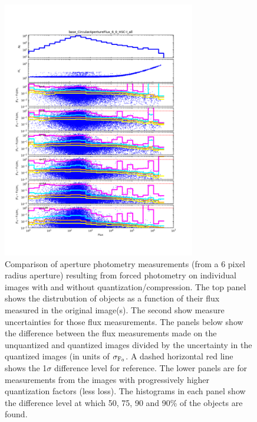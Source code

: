 \begin{figure}
\centering
\includegraphics[width=0.75\textwidth]{figure/rplot_all_base_CircularApertureFlux_6_0_HSC-I.png}
\caption{Comparison of aperture photometry measurements (from a 6 pixel radius aperture) resulting from forced photometry 
on individual images with and without quantization/compression.
The top panel shows the distrubution of objects as a function of their flux measured in the original image(s).  The second show 
measure uncertainties for those flux measurements.  The panels below show the difference between the flux measurements made on the
unquantized and quantized images divided by the uncertainty in the quantized images (in units of $\sigma_{\rm F_0}$.  A dashed horizontal 
red line shows the 1$\sigma$ difference level for reference.  The lower panels are for measurements from the images with 
progressively higher quantization factors (less loss).
The histograms in each panel show the difference level at which 50, 75, 90 and 90\% of the objects are found.}
\label{plot_app_flux}
\end{figure}

